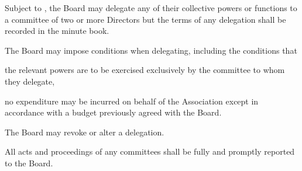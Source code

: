 \documentclass[10pt]{mk-articles-of-association}
\newcommand{\EC}[0]{Board}
\newcommand{\Exec}[0]{\EC{} }
\begin{document}
\begin{constenum}

\item Subject to , the \Exec may delegate
  any of their collective powers or functions to a committee of two or
  more Directors but the terms of any delegation shall be
  recorded in the minute book.

\item The \Exec may impose conditions when delegating, including
  the conditions that

\begin{constenum}

\item the relevant powers are to be exercised exclusively by the
  committee to whom they delegate,

\item no expenditure may be incurred on behalf of the Association except
  in accordance with a budget previously agreed with the \EC.

\end{constenum}

\item The \Exec may revoke or alter a delegation.

\item All acts and proceedings of any committees shall be fully and
  promptly reported to the \EC.

\end{constenum}

\end{document}
